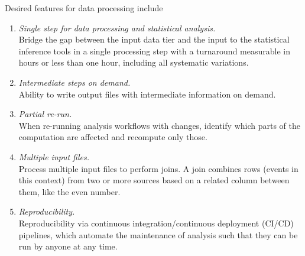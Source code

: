 Desired features for data processing include
\begin{enumerate}
\item{} \label{item:onego} {\em Single step for data processing and statistical analysis.} \\
Bridge the gap between the input data tier and the input to the statistical inference tools in a single processing step with a turnaround measurable in hours or less than one hour, including all systematic variations.

\item{} \label{item:snapshot} {\em Intermediate steps on demand.} \\
Ability to write output files with intermediate information on demand.

\item{} \label{item:rerun} {\em Partial re-run.} \\
When re-running analysis workflows with changes, identify which parts of the computation are affected and recompute only those.

\item{} \label{item:joins} {\em Multiple input files.} \\
Process multiple input files to perform joins. A join combines rows (events in this context) from two or more sources based on a related column between them, like the even number.

\item{} \label{item:cicd} {\em Reproducibility.} \\
Reproducibility via continuous integration/continuous deployment (CI/CD) pipelines, which automate the maintenance of analysis such that they can be run by anyone at any time.
\end{enumerate}

